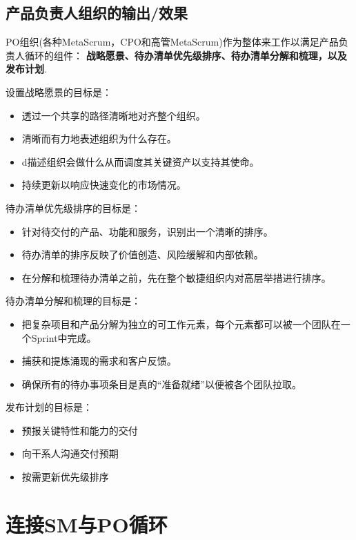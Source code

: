 \documentclass[12pt,a4paper,parskip=full]{scrartcl}
\begin{document}
\begin{CJK*}{UTF8}{gbsn}
\subsection{产品负责人组织的输出/效果}
PO组织(各种MetaScrum，CPO和高管MetaScrum)作为整体来工作以满足产品负责人循环的组件： \textbf{战略愿景、待办清单优先级排序、待办清单分解和梳理，以及发布计划}.

设置战略愿景的目标是：

\begin{itemize}
\item 透过一个共享的路径清晰地对齐整个组织。
\item 清晰而有力地表述组织为什么存在。
\item d描述组织会做什么从而调度其关键资产以支持其使命。
\item 持续更新以响应快速变化的市场情况。
\end{itemize}
待办清单优先级排序的目标是：
\begin{itemize}
\item 针对待交付的产品、功能和服务，识别出一个清晰的排序。
\item 待办清单的排序反映了价值创造、风险缓解和内部依赖。
\item 在分解和梳理待办清单之前，先在整个敏捷组织内对高层举措进行排序。
\end{itemize}
待办清单分解和梳理的目标是：
\begin{itemize}
\item 把复杂项目和产品分解为独立的可工作元素，每个元素都可以被一个团队在一个Sprint中完成。
\item 捕获和提炼涌现的需求和客户反馈。
\item 确保所有的待办事项条目是真的“准备就绪”以便被各个团队拉取。
\end{itemize}
发布计划的目标是：
\begin{itemize}
\item 预报关键特性和能力的交付
\item 向干系人沟通交付预期
\item 按需更新优先级排序
\end{itemize}

\section{连接SM与PO循环}


\end{CJK*}
\end{document}
